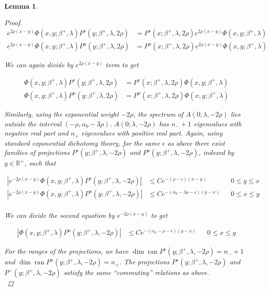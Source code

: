 \documentclass[12pt]{article}
\def\R{{\mathbb R}}
\DeclareMathOperator{\ran}{ran}
\newtheorem{lemma}{Lemma}
\begin{document}
\begin{lemma}
\begin{proof}
\begin{align*}
e^{2 \rho (x - y)} \Phi(x, y; \beta^+, \lambda)P^s(y; \beta^+, \lambda, 2 \rho) 
&= P^s(x; \beta^+, \lambda, 2 \rho) e^{2 \rho (x - y)} \Phi(x, y; \beta^+, \lambda) \\
e^{2 \rho (x - y)} \Phi(x, y; \beta^+, \lambda)P^u(y; \beta^+, \lambda, 2 \rho) 
&= P^u(x; \beta^+, \lambda, 2 \rho)e^{2 \rho (x - y)} \Phi(x, y; \beta^+, \lambda) 
\end{align*}

We can again divide by $e^{2 \rho (x - y)}$ term to get 

\begin{align*}
\Phi(x, y; \beta^+, \lambda)P^s(y; \beta^+, \lambda, 2 \rho) 
&= P^s(x; \beta^+, \lambda, 2 \rho) \Phi(x, y; \beta^+, \lambda) \\
\Phi(x, y; \beta^+, \lambda)P^u(y; \beta^+, \lambda, 2 \rho) 
&= P^u(x; \beta^+, \lambda, 2 \rho) \Phi(x, y; \beta^+, \lambda) 
\end{align*}

Similarly, using the exponential weight $-2 \rho$, the spectrum of $A(0; \lambda, -2 \rho)$ lies outside the interval $(-\rho, \alpha_0 - 3 \rho)$. $A(0; \lambda, -2 \rho)$ has $n_- + 1$ eigenvalues with negative real part and $n_+$ eigenvalues with positive real part. Again, using standard exponential dichotomy theory, for the same $\epsilon$ as above there exist families of projections $P^s(y; \beta^+, \lambda, -2 \rho)$ and $P^u(y; \beta^+, \lambda, -2 \rho)$, indexed by $y \in \R^+$, such that

\begin{align*}
|e^{-2 \rho (x - y)}\Phi(x, y; \beta^+, \lambda)P^s(y; \beta^+, \lambda, -2 \rho)| &\leq C e^{-(\rho - \epsilon)(x - y)} && 0 \leq y \leq x \\
|e^{-2 \rho (x - y)}\Phi(x, y; \beta^+, \lambda)P^u(y; \beta^+, \lambda, -2 \rho)| &\leq C e^{-(\alpha_0 - 3 \rho - \epsilon)(y - x)} && 0 \leq x \leq y \\
\end{align*}

We can divide the second equation by $e^{-2 \rho (x - y)}$ to get

\begin{align}\label{Pu2-rhobound}
|\Phi(x, y; \beta^+, \lambda)P^u(y; \beta^+, \lambda, -2 \rho)| &\leq C e^{-(\alpha_0 - \rho - \epsilon)(y - x)} && 0 \leq x \leq y 
\end{align}

For the ranges of the projections, we have $\dim \ran P^s(y; \beta^+, \lambda, -2 \rho) = n_- + 1$ and $\dim \ran P^u(y; \beta^+, \lambda, -2 \rho) = n_+$. The projections $P^s(y; \beta^+, \lambda, -2 \rho)$ and $P^-(y; \beta^+, \lambda, -2 \rho)$ satisfy the same ``commuting'' relations as above.\\


\end{proof}
\end{lemma}
\end{document}
